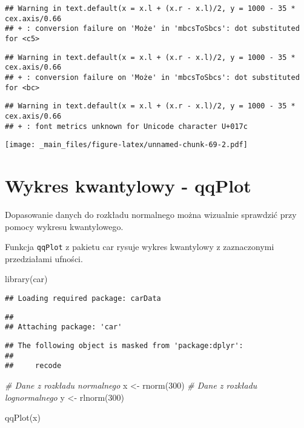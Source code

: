 \documentclass[
]{book}
\newenvironment{Shaded}{\begin{snugshade}}{\end{snugshade}}
\newcommand{\CommentTok}[1]{\textcolor[rgb]{0.56,0.35,0.01}{\textit{#1}}}
\newcommand{\DecValTok}[1]{\textcolor[rgb]{0.00,0.00,0.81}{#1}}
\newcommand{\FunctionTok}[1]{\textcolor[rgb]{0.00,0.00,0.00}{#1}}
\newcommand{\NormalTok}[1]{#1}
\newcommand{\OtherTok}[1]{\textcolor[rgb]{0.56,0.35,0.01}{#1}}
\begin{document}
\begin{verbatim}
## Warning in text.default(x = x.l + (x.r - x.l)/2, y = 1000 - 35 * cex.axis/0.66
## + : conversion failure on 'Może' in 'mbcsToSbcs': dot substituted for <c5>
\end{verbatim}

\begin{verbatim}
## Warning in text.default(x = x.l + (x.r - x.l)/2, y = 1000 - 35 * cex.axis/0.66
## + : conversion failure on 'Może' in 'mbcsToSbcs': dot substituted for <bc>
\end{verbatim}

\begin{verbatim}
## Warning in text.default(x = x.l + (x.r - x.l)/2, y = 1000 - 35 * cex.axis/0.66
## + : font metrics unknown for Unicode character U+017c
\end{verbatim}

\texttt{[image: \_main\_files/figure-latex/unnamed-chunk-69-2.pdf]}

\hypertarget{wykres-kwantylowy---qqplot}{%
\section{Wykres kwantylowy - qqPlot}\label{wykres-kwantylowy---qqplot}}

Dopasowanie danych do rozkładu normalnego można wizualnie sprawdzić przy pomocy wykresu kwantylowego.

Funkcja \texttt{qqPlot} z pakietu car rysuje wykres kwantylowy z zaznaczonymi przedziałami ufności.

\begin{Shaded}
\begin{Highlighting}[]
\FunctionTok{library}\NormalTok{(car)}
\end{Highlighting}
\end{Shaded}

\begin{verbatim}
## Loading required package: carData
\end{verbatim}

\begin{verbatim}
## 
## Attaching package: 'car'
\end{verbatim}

\begin{verbatim}
## The following object is masked from 'package:dplyr':
## 
##     recode
\end{verbatim}

\begin{Shaded}
\begin{Highlighting}[]
\CommentTok{\# Dane z rozkładu normalnego}
\NormalTok{x }\OtherTok{\textless{}{-}} \FunctionTok{rnorm}\NormalTok{(}\DecValTok{300}\NormalTok{)}
\CommentTok{\# Dane z rozkładu lognormalnego}
\NormalTok{y }\OtherTok{\textless{}{-}} \FunctionTok{rlnorm}\NormalTok{(}\DecValTok{300}\NormalTok{)}

\FunctionTok{qqPlot}\NormalTok{(x)}
\end{Highlighting}
\end{Shaded}
\end{document}
